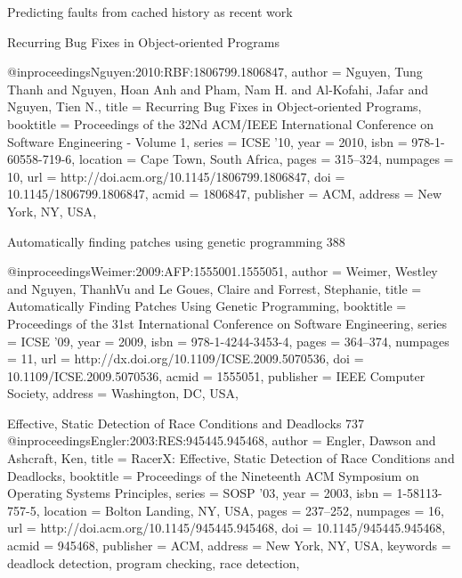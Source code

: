 \documentclass[runningheads,a4paper]{llncs}
\begin{document}
Predicting faults from cached history
as recent work

Recurring Bug Fixes in Object-oriented Programs

@inproceedings{Nguyen:2010:RBF:1806799.1806847,
 author = {Nguyen, Tung Thanh and Nguyen, Hoan Anh and Pham, Nam H. and Al-Kofahi, Jafar and Nguyen, Tien N.},
 title = {Recurring Bug Fixes in Object-oriented Programs},
 booktitle = {Proceedings of the 32Nd ACM/IEEE International Conference on Software Engineering - Volume 1},
 series = {ICSE '10},
 year = {2010},
 isbn = {978-1-60558-719-6},
 location = {Cape Town, South Africa},
 pages = {315--324},
 numpages = {10},
 url = {http://doi.acm.org/10.1145/1806799.1806847},
 doi = {10.1145/1806799.1806847},
 acmid = {1806847},
 publisher = {ACM},
 address = {New York, NY, USA},
}

Automatically finding patches using genetic programming 388

@inproceedings{Weimer:2009:AFP:1555001.1555051,
 author = {Weimer, Westley and Nguyen, ThanhVu and Le Goues, Claire and Forrest, Stephanie},
 title = {Automatically Finding Patches Using Genetic Programming},
 booktitle = {Proceedings of the 31st International Conference on Software Engineering},
 series = {ICSE '09},
 year = {2009},
 isbn = {978-1-4244-3453-4},
 pages = {364--374},
 numpages = {11},
 url = {http://dx.doi.org/10.1109/ICSE.2009.5070536},
 doi = {10.1109/ICSE.2009.5070536},
 acmid = {1555051},
 publisher = {IEEE Computer Society},
 address = {Washington, DC, USA},
} 



Effective, Static Detection of Race Conditions and Deadlocks 737
@inproceedings{Engler:2003:RES:945445.945468,
 author = {Engler, Dawson and Ashcraft, Ken},
 title = {RacerX: Effective, Static Detection of Race Conditions and Deadlocks},
 booktitle = {Proceedings of the Nineteenth ACM Symposium on Operating Systems Principles},
 series = {SOSP '03},
 year = {2003},
 isbn = {1-58113-757-5},
 location = {Bolton Landing, NY, USA},
 pages = {237--252},
 numpages = {16},
 url = {http://doi.acm.org/10.1145/945445.945468},
 doi = {10.1145/945445.945468},
 acmid = {945468},
 publisher = {ACM},
 address = {New York, NY, USA},
 keywords = {deadlock detection, program checking, race detection},
} 
\end{document}
